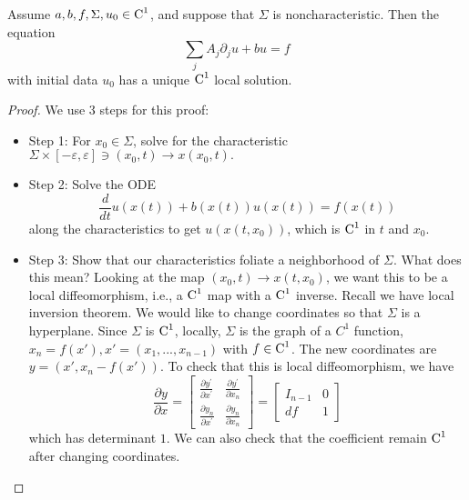 \begin{theorem}
    Assume $a,b,f,\Sigma, u_0 \in \operatorname{C}^1$, and suppose that $\Sigma$ is noncharacteristic. Then the equation 
    \[
        \sum_{j} A_j\partial_j u + bu = f
    \]
    with initial data $u_0$ has a unique $\operatorname{C}^1$ local solution.
\end{theorem}

\begin{proof}
We use 3 steps for this proof: 
\begin{itemize}
    \item Step 1: For $x_0 \in \Sigma$, solve for the characteristic $\Sigma \times [-\varepsilon, \varepsilon] \ni (x_0,t) \to x(x_0,t).$
    \item Step 2: Solve the ODE 
    \[
        \frac{d}{dt}u(x(t))  + b(x(t))u(x(t)) = f(x(t))
    \]
    along the characteristics to get $u(x(t,x_0))$, which is $\operatorname{C}^1$ in $t$ and $x_0$.
    \item Step 3: Show that our characteristics foliate a neighborhood of $\Sigma$. What does this mean? Looking at the map $(x_0,t) \to x(t,x_0)$, we want this to be a local diffeomorphism, i.e., a $\operatorname{C}^1$ map with a $\operatorname{C}^1$ inverse. Recall we have local inversion theorem.
    We would like to change coordinates so that $\Sigma$ is a hyperplane. Since $\Sigma$ is $\operatorname{C}^1$, locally, $\Sigma$ is the graph of a $C^1$ function, $x_n = f(x'), x' = (x_1,...,x_{n-1})$ with $f\in \operatorname{C}^1$. The new coordinates are $y=(x',x_n-f(x'))$. To check that this is local diffeomorphism, we have 
    \[
        \frac{\partial y}{\partial x}=\left[\begin{array}{cc}
            \frac{\partial y^{\prime}}{\partial x^{\prime}} & \frac{\partial y^{\prime}}{\partial x_{n}} \\
            \frac{\partial y_{n}}{\partial x^{\prime}} & \frac{\partial y_{n}}{\partial x_{n}}
            \end{array}\right]=\left[\begin{array}{cc}
            I_{n-1} & 0 \\
            d f & 1
            \end{array}\right]
    \]
    which has determinant $1$. We can also check that the coefficient remain $\operatorname{C}^1$ after changing coordinates. 
     

\end{itemize}
\end{proof}
